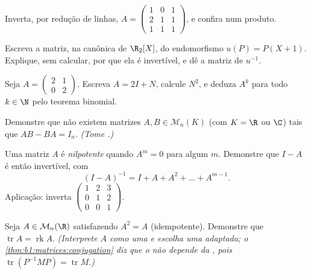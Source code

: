 \begin{exercise}[$\star$]\label{exo:b1:matrices:3}
Inverta, por redução de linhas, $A = \begin{pmatrix} 1 & 0 & 1\\ 2 & 1 &
1\\ 1 & 1 & 1 \end{pmatrix}$, e confira num produto.
\end{exercise}

\begin{exercise}[$\star$]\label{exo:b1:matrices:4}
Escreva a matriz, na  canônica de $\R_2[X]$, do endomorfismo
$u(P) = P(X + 1)$. Explique, sem calcular, por que ela é invertível, e dê a
matriz de $u^{-1}$.
\end{exercise}

\begin{exercise}[$\star\star$]\label{exo:b1:matrices:5}
Seja $A = \begin{pmatrix} 2 & 1 \\ 0 & 2\end{pmatrix}$. Escreva $A =
2I + N$, calcule $N^2$, e deduza $A^k$ para todo
$k \in \N$ pelo teorema binomial.
\end{exercise}

\begin{exercise}[$\star\star$]\label{exo:b1:matrices:6}
Demonstre que não existem matrizes $A, B \in \mathcal{M}_n(K)$ (com $K = \R$ ou $\C$) tais
que $AB - BA = I_n$. \emph{(Tome .)}
\end{exercise}

\begin{exercise}[$\star\star$]\label{exo:b1:matrices:7}
Uma matriz $A$ é \emph{nilpotente} quando $A^m = 0$ para algum $m$.
Demonstre que $I - A$ é então invertível, com
\[
(I - A)^{-1} = I + A + A^2 + \dots + A^{m-1} .
\]
Aplicação: inverta $\begin{pmatrix} 1 & 2 & 3\\ 0 & 1 & 2\\ 0 & 0 &
1\end{pmatrix}$.
\end{exercise}

\begin{exercise}[$\star\star$]\label{exo:b1:matrices:8}
Seja $A \in \mathcal{M}_n(\R)$ satisfazendo $A^2 = A$ (idempotente). Demonstre que
$\operatorname{tr} A = \operatorname{rk} A$. \emph{(Interprete $A$ como uma  e escolha uma 
adaptada; o \cref{thm:b1:matrices:conjugation} diz que o  não depende da , pois $\operatorname{tr}(P^{-1}MP) =
\operatorname{tr} M$.)}
\end{exercise}

